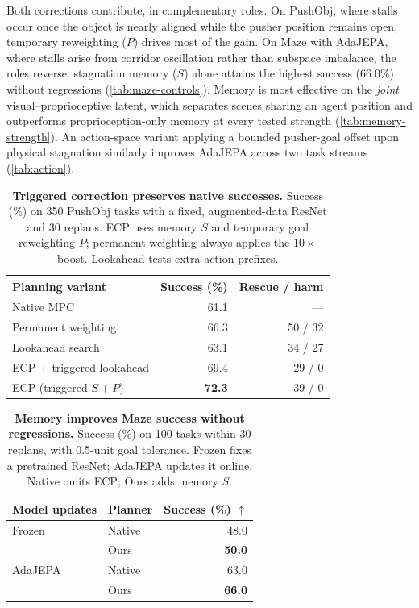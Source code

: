 \par\smallskip\noindent Both corrections contribute, in complementary roles.
On PushObj, where stalls occur once the object is nearly aligned while the pusher position remains open, temporary reweighting ($P$) drives most of the gain. On Maze with AdaJEPA, where stalls arise from corridor oscillation rather than subspace imbalance, the roles reverse: stagnation memory ($S$) alone attains the highest success (66.0\%) without regressions (\cref{tab:maze-controls}). Memory is most effective on the \emph{joint} visual--proprioceptive latent, which separates scenes sharing an agent position and outperforms proprioception-only memory at every tested strength (\cref{tab:memory-strength}). An action-space variant applying a bounded pusher-goal offset upon physical stagnation similarly improves AdaJEPA across two task streams (\cref{tab:action}).

\begin{table}[t]
\centering
\caption{\textbf{Triggered correction preserves native successes.} Success (\%) on 350 PushObj tasks with a fixed, augmented-data ResNet and 30 replans. ECP uses memory $S$ and temporary goal reweighting $P$; permanent weighting always applies the $10\times$ boost. Lookahead tests extra action prefixes.}
\label{tab:timing}
\small
\begin{tabular}{lrr}
\toprule
Planning variant & Success (\%) & Rescue / harm\\
\midrule
Native MPC &61.1&---\\
Permanent weighting &66.3&50 / 32\\
Lookahead search &63.1&34 / 27\\
ECP + triggered lookahead &69.4&29 / 0\\
ECP (triggered $S{+}P$) &\textbf{72.3}&39 / 0\\
\bottomrule
\end{tabular}
\end{table}

\begin{table}[t]
\centering
\caption{\textbf{Memory improves Maze success without regressions.} Success (\%) on 100 tasks within 30 replans, with 0.5-unit goal tolerance. Frozen fixes a pretrained ResNet; AdaJEPA updates it online. Native omits ECP; Ours adds memory $S$.}
\label{tab:maze}
\small
\begin{tabular*}{0.94\columnwidth}{@{\extracolsep{\fill}}llr@{}}
\toprule
Model updates & Planner & Success (\%) $\uparrow$\\
\midrule
Frozen & Native &48.0\\
& Ours &\textbf{50.0}\\
AdaJEPA & Native &63.0\\
& Ours &\textbf{66.0}\\
\bottomrule
\end{tabular*}
\end{table}

